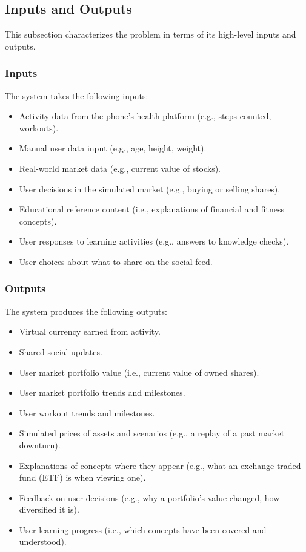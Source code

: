 \documentclass{article}
\begin{document}
\subsection{Inputs and Outputs}

This subsection characterizes the problem in terms of its high-level inputs and outputs.

\subsubsection{Inputs}
The system takes the following inputs:
\begin{itemize}
    \item{Activity data from the phone's health platform (e.g., steps counted, workouts).}
    \item{Manual user data input (e.g., age, height, weight).}
    \item{Real-world market data (e.g., current value of stocks).}
    \item{User decisions in the simulated market (e.g., buying or selling shares).}
    \item{Educational reference content (i.e., explanations of financial and fitness concepts).}
    \item{User responses to learning activities (e.g., answers to knowledge checks).}
    \item User choices about what to share on the social feed.
\end{itemize}

\subsubsection{Outputs}
The system produces the following outputs:
\begin{itemize}
    \item Virtual currency earned from activity.
    \item Shared social updates.
    \item{User market portfolio value (i.e., current value of owned shares).}
    \item{User market portfolio trends and milestones.}
    \item{User workout trends and milestones.}
    \item{Simulated prices of assets and scenarios (e.g., a replay of a past market downturn).}
    \item{Explanations of concepts where they appear (e.g., what an exchange-traded fund (ETF) is when viewing one).}
    \item{Feedback on user decisions (e.g., why a portfolio's value changed, how diversified it is).}
    \item{User learning progress (i.e., which concepts have been covered and understood).}
\end{itemize}
\end{document}
